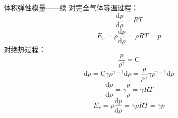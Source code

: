 \begin{frame}{体积弹性模量——续}
  对完全气体等温过程：
  \begin{equation*}
    \frac{\mathrm{d}p}{\mathrm{d}\rho}
    =
    RT
  \end{equation*}
  \begin{equation*}
    E_{v}
    =
    \rho\frac{\mathrm{d}p}{\mathrm{d}\rho}
    =
    \rho RT
    =
    p
  \end{equation*}
  对绝热过程：
  \begin{equation*}
    \frac{p}{\rho^{\gamma}} = \mathrm{C}
  \end{equation*}
  \begin{equation*}
    \mathrm{d}p
    =
    \mathrm{C}\gamma \rho^{\gamma-1}\mathrm{d}\rho
    =
    \frac{p}{\rho^{\gamma}}\gamma \rho^{\gamma-1}\mathrm{d}\rho
  \end{equation*}
  \begin{equation*}
    \frac{\mathrm{d}p}{\mathrm{d}\rho}
    =
    \gamma\frac{p}{\rho}
    =
    \gamma RT
  \end{equation*}
  \begin{equation*}
    E_{v}
    =
    \rho\frac{\mathrm{d}p}{\mathrm{d}\rho}
    =
    \gamma\rho RT
    =\gamma p
  \end{equation*}

\end{frame}

